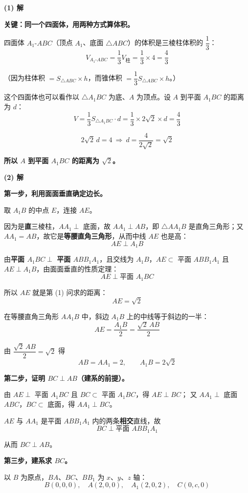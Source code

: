 \textbf{(1) 解}

\textbf{关键：同一个四面体，用两种方式算体积。}

四面体 $A_1\text{-}ABC$（顶点 $A_1$、底面 $\triangle ABC$）的体积是三棱柱体积的 $\dfrac13$：
\[V_{A_1\text{-}ABC}=\frac13V_{\text{柱}}=\frac13\times4=\frac43\]

（因为柱体积 $=S_{\triangle ABC}\times h$，而锥体积 $=\dfrac13S_{\triangle ABC}\times h$。）

这个四面体也可以看作以 $\triangle A_1BC$ 为底、$A$ 为顶点。设 $A$ 到平面 $A_1BC$ 的距离为 $d$：
\[V=\frac13S_{\triangle A_1BC}\cdot d=\frac13\times2\sqrt2\times d=\frac43\]

\[2\sqrt2\,d=4\ \Longrightarrow\ d=\frac4{2\sqrt2}=\sqrt2\]

\textbf{所以 $A$ 到平面 $A_1BC$ 的距离为 $\sqrt2$。}

\par\medskip

\textbf{(2) 解}

\textbf{第一步，利用面面垂直确定边长。}

取 $A_1B$ 的中点 $E$，连接 $AE$。

因为是\textbf{直}三棱柱，$AA_1\perp$ 底面，故 $AA_1\perp AB$，即 $\triangle AA_1B$ 是直角三角形；又 $AA_1=AB$，故它是\textbf{等腰直角三角形}，从而中线 $AE$ 也是高：
\[AE\perp A_1B\]

由\textbf{平面 $A_1BC\perp$ 平面 $ABB_1A_1$}，且交线为 $A_1B$，$AE\subset$ 平面 $ABB_1A_1$ 且 $AE\perp A_1B$，由面面垂直的性质定理：
\[AE\perp\text{平面 }A_1BC\]

所以 $AE$ 就是第 (1) 问求的距离：
\[AE=\sqrt2\]

在等腰直角三角形 $AA_1B$ 中，斜边 $A_1B$ 上的中线等于斜边的一半：
\[AE=\frac{A_1B}2=\frac{\sqrt2\,AB}2\]

由 $\dfrac{\sqrt2\,AB}2=\sqrt2$ 得
\[AB=AA_1=2,\qquad A_1B=2\sqrt2\]

\textbf{第二步，证明 $BC\perp AB$（建系的前提）。}

由 $AE\perp$ 平面 $A_1BC$ 且 $BC\subset$ 平面 $A_1BC$，得 $AE\perp BC$；
又 $AA_1\perp$ 底面 $ABC$，$BC\subset$ 底面，得 $AA_1\perp BC$。

$AE$ 与 $AA_1$ 是平面 $ABB_1A_1$ 内的两条\textbf{相交}直线，故
\[BC\perp\text{平面 }ABB_1A_1\]

从而 $BC\perp AB$。

\textbf{第三步，建系求 $BC$。}

以 $B$ 为原点，$BA$、$BC$、$BB_1$ 为 $x$、$y$、$z$ 轴：
\[B(0,0,0),\quad A(2,0,0),\quad A_1(2,0,2),\quad C(0,c,0)\]

